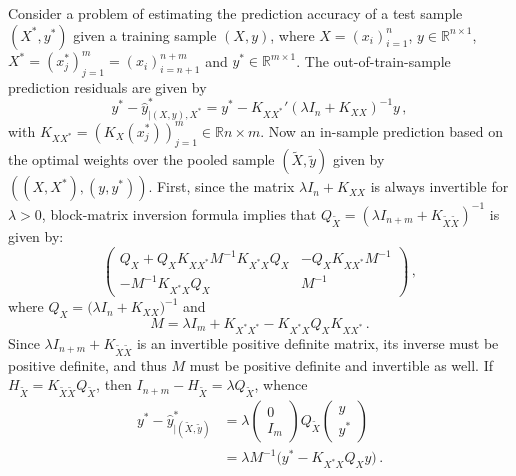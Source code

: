 \documentclass[a4paper,14pt]{extarticle}
\newcommand{\Real}{\mathbb{R}}
\begin{document}
Consider a problem of estimating the prediction accuracy of a test sample $(X^*, y^*)$
given a training sample $(X, y)$, where $X = (x_i)_{i=1}^n$, $y\in \Real^{n\times 1}$,
$X^* = (x^*_j)_{j=1}^m = (x_i)_{i=n+1}^{n+m}$ and $y^*\in \Real^{m\times 1}$. 
The out-of-train-sample prediction residuals are given by
\begin{equation*}
  y^* - \hat{y}^*_{|(X, y), X^*}
    = y^* - K_{XX^*}' (\lambda I_n + K_{XX})^{-1} y
    \,,
\end{equation*}
with $K_{XX^*} = (K_X(x^*_j))_{j=1}^m \in \Real{n\times m}$.
Now an in-sample prediction based on the optimal weights over the pooled sample
$(\tilde{X}, \tilde{y})$ given by $((X, X^*), (y, y^*))$. First, since the matrix
$\lambda I_n + K_{XX}$ is always invertible for $\lambda > 0$, block-matrix inversion
formula implies that $Q_{\tilde{X}} = (\lambda I_{n+m} + K_{\tilde{X}\tilde{X}})^{-1}$
is given by:
\begin{equation*}
  \begin{pmatrix}
    Q_X + Q_X K_{XX^*} M^{-1} K_{X^*X} Q_X & - Q_X K_{XX^*} M^{-1} \\
    - M^{-1} K_{X^*X} Q_X & M^{-1}
  \end{pmatrix}
  \,,
\end{equation*}
where $Q_X = \bigl( \lambda I_n + K_{XX} \bigr)^{-1}$ and
\begin{equation*}
  M = \lambda I_m + K_{X^*X^*} - K_{X^*X} Q_X K_{XX^*} \,.
\end{equation*}
Since $\lambda I_{n+m} + K_{\tilde{X}\tilde{X}}$ is an invertible positive definite
matrix, its inverse must be positive definite, and thus $M$ must be positive definite
and invertible as well. If $H_{\tilde{X}} = K_{\tilde{X}\tilde{X}} Q_{\tilde{X}}$,
then $I_{n+m} - H_{\tilde{X}} = \lambda Q_{\tilde{X}}$, whence
\begin{align}
  y^* - \hat{y}^*_{|(\tilde{X}, \tilde{y})}
    &= \lambda \begin{pmatrix} 0\\ I_m \end{pmatrix} Q_{\tilde{X}}
        \begin{pmatrix} y\\ y^* \end{pmatrix} \nonumber \\
    &= \lambda M^{-1} \bigl( y^* - K_{X^*X} Q_X y \bigr) %
    \label{eq:holdout_resid}
    \,.
\end{align}
\end{document}
